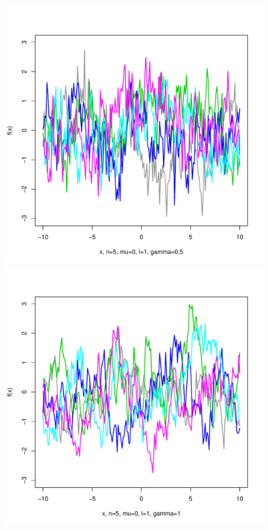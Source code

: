 \documentclass[12pt,letterpaper]{article}
\begin{document}
\begin{figure}
\begin{center}
\includegraphics[scale=0.2]{hw321/n5-m0-l1-g1.pdf}
\includegraphics[scale=0.2]{hw321/n5-m0-l1-g2.pdf}

\end{center}
\end{figure}
\end{document}
